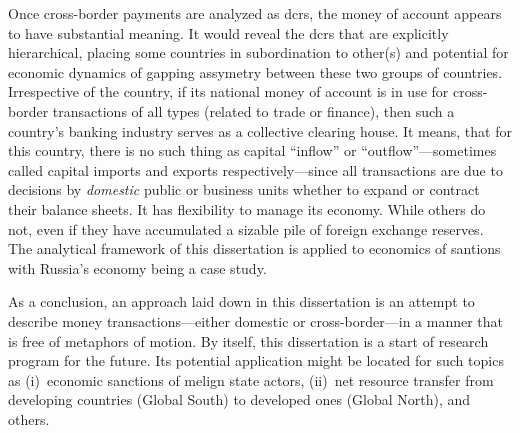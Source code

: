 Once cross-border payments are analyzed as \acp{dcr}, the money of account appears to have substantial meaning. It would reveal the \acp{dcr} that are explicitly hierarchical, placing some countries in subordination to other(s) and potential for economic dynamics of gapping assymetry between these two groups of countries. Irrespective of the country, if its national money of account is in use for cross-border transactions of all types (related to trade or finance), then such a country's banking industry serves as a collective clearing house. It means, that for this country, there is no such thing as capital ``inflow''  or ``outflow''---sometimes called capital imports and exports respectively---since all transactions are due to decisions by \textit{domestic} public or business units whether to expand or contract their balance sheets. It has flexibility to manage its economy. While others do not, even if they have accumulated a sizable pile of foreign exchange reserves. The analytical framework of this dissertation is applied to economics of santions with Russia's economy being a case study.

As a conclusion, an approach laid down in this dissertation is an attempt to describe money transactions---either domestic or cross-border---in a manner that is free of metaphors of motion. By itself, this dissertation is a start of research program for the future. Its potential application might be located for such topics as (i)~economic sanctions of melign state actors, (ii)~net resource transfer from developing countries (Global South) to developed ones (Global North), and others.   

\newpage
